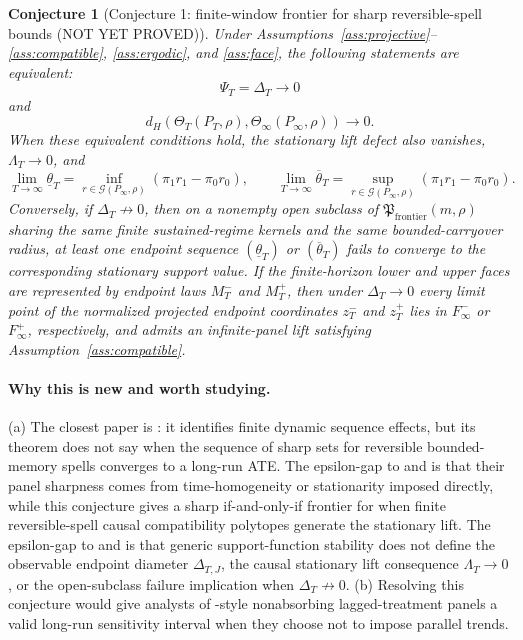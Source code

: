 \documentclass[11pt]{article}
\theoremstyle{definition}
\theoremstyle{plain}
\newtheorem{conjecture}{Conjecture}
\theoremstyle{remark}
\begin{document}
\begin{conjecture}[Conjecture 1: finite-window frontier for sharp reversible-spell bounds (NOT YET PROVED)]\label{conj:cesaro-commutation}
Under Assumptions~\ref{ass:projective}--\ref{ass:compatible}, \ref{ass:ergodic}, and \ref{ass:face}, the following statements are equivalent:
\[
\Psi_T=\Delta_T\to0
\]
and
\[
d_H\!\left(\Theta_T(P_T,\rho),\Theta_{\infty}(P_{\infty},\rho)\right)\to0.
\]
When these equivalent conditions hold, the stationary lift defect also vanishes, \(\Lambda_T\to0\), and
\[
\lim_{T\to\infty}\underline\theta_T
=\inf_{r\in\mathcal G(P_{\infty},\rho)}(\pi_1r_1-\pi_0r_0),
\qquad
\lim_{T\to\infty}\overline\theta_T
=\sup_{r\in\mathcal G(P_{\infty},\rho)}(\pi_1r_1-\pi_0r_0).
\]
Conversely, if \(\Delta_T\not\to0\), then on a nonempty open subclass of \(\mathfrak P_{\mathrm{frontier}}(m,\rho)\) sharing the same finite sustained-regime kernels and the same bounded-carryover radius, at least one endpoint sequence \((\underline\theta_T)\) or \((\overline\theta_T)\) fails to converge to the corresponding stationary support value.  If the finite-horizon lower and upper faces are represented by endpoint laws \(M_T^{-}\) and \(M_T^{+}\), then under \(\Delta_T\to0\) every limit point of the normalized projected endpoint coordinates \(z_T^{-}\) and \(z_T^{+}\) lies in \(F_{\infty}^{-}\) or \(F_{\infty}^{+}\), respectively, and admits an infinite-panel lift satisfying Assumption~\ref{ass:compatible}.
\end{conjecture}

\paragraph{Why this is new and worth studying.}
(a) The closest paper is \citet{Han2021}: it identifies finite dynamic sequence effects, but its theorem does not say when the sequence of sharp sets for reversible bounded-memory spells converges to a long-run ATE.  The epsilon-gap to \citet{ChernozhukovFernandezValHahnNewey2013} and \citet{JunLeeShin2016} is that their panel sharpness comes from time-homogeneity or stationarity imposed directly, while this conjecture gives a sharp if-and-only-if frontier for when finite reversible-spell causal compatibility polytopes generate the stationary lift.  The epsilon-gap to \citet{Schneider1993} and \citet{RockafellarWets1998} is that generic support-function stability does not define the observable endpoint diameter \(\Delta_{T,J}\), the causal stationary lift consequence \(\Lambda_T\to0\), or the open-subclass failure implication when \(\Delta_T\not\to0\).  (b) Resolving this conjecture would give analysts of \citet{DeChaisemartinDHaultfoeuille2024}-style nonabsorbing lagged-treatment panels a valid long-run sensitivity interval when they choose not to impose parallel trends.
\end{document}
